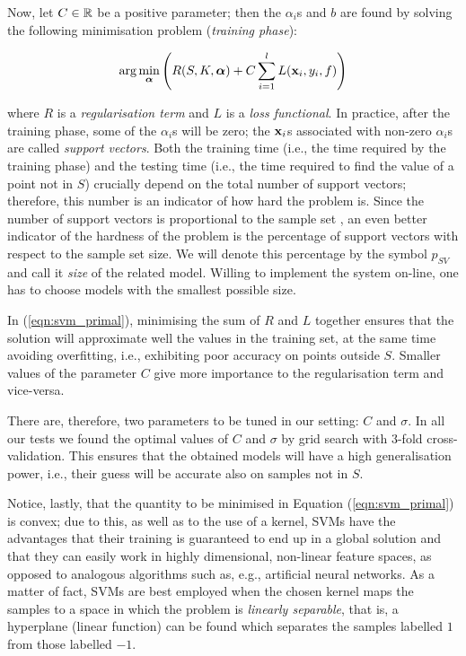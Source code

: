 Now, let $C \in \mathbb{R}$ be a positive parameter; then the $\alpha_i$s and
$b$ are found by solving the following minimisation problem
(\emph{training phase}):

\begin{equation} \label{eqn:svm_primal}
  \arg \min_{\boldsymbol{\alpha}} \left( R(S,K,\boldsymbol{\alpha}) + C \sum_{i=1}^l L(\mathbf{x}_i,y_i,f) \right)
\end{equation}

\noindent where $R$ is a \emph{regularisation term} and $L$ is a
\emph{loss functional}. In practice, after the training phase, some of
the $\alpha_i$s will be zero; the $\mathbf{x}_i$s associated with non-zero
$\alpha_i$s are called \emph{support vectors}. Both the training time
(i.e., the time required by the training phase) and the testing time
(i.e., the time required to find the value of a point not in $S$)
crucially depend on the total number of support vectors; therefore,
this number is an indicator of how hard the problem is. Since the
number of support vectors is proportional to the sample set
\cite{Steinwart03}, an even better indicator of the hardness of the
problem is the percentage of support vectors with respect to the
sample set size. We will denote this percentage by the symbol $p_{SV}$
and call it \emph{size} of the related model. Willing to implement the
system on-line, one has to choose models with the smallest possible
size.

In (\ref{eqn:svm_primal}), minimising the sum of $R$ and $L$ together
ensures that the solution will approximate well the values in the
training set, at the same time avoiding overfitting, i.e., exhibiting
poor accuracy on points outside $S$. Smaller values of the parameter
$C$ give more importance to the regularisation term and vice-versa.

There are, therefore, two parameters to be tuned in our setting: $C$
and $\sigma$. In all our tests we found the optimal values of $C$ and
$\sigma$ by grid search with $3$-fold cross-validation. This ensures
that the obtained models will have a high generalisation power, i.e.,
their guess will be accurate also on samples not in $S$.

Notice, lastly, that the quantity to be minimised in Equation
(\ref{eqn:svm_primal}) is convex; due to this, as well as to the use
of a kernel, SVMs have the advantages that their training is
guaranteed to end up in a global solution and that they can easily
work in highly dimensional, non-linear feature spaces, as opposed to
analogous algorithms such as, e.g., artificial neural networks. As a
matter of fact, SVMs are best employed when the chosen kernel maps the
samples to a space in which the problem is \emph{linearly separable},
that is, a hyperplane (linear function) can be found which separates
the samples labelled $1$ from those labelled $-1$.

